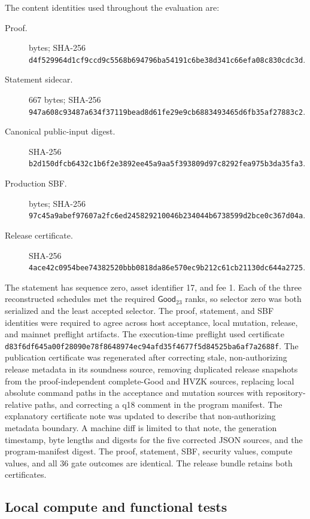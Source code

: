 The content identities used throughout the evaluation are:
\begin{description}
  \item[Proof.] \ProfileProofBytes{} bytes; SHA-256
  \nolinkurl{d4f529964d1cf9ccd9c5568b694796ba54191c6be38d341c66efa08c830cdc3d}.
  \item[Statement sidecar.] 667 bytes; SHA-256
  \nolinkurl{947a608c93487a634f37119bead8d61fe29e9cb6883493465d6fb35af27883c2}.
  \item[Canonical public-input digest.] SHA-256
  \nolinkurl{b2d150dfcb6432c1b6f2e3892ee45a9aa5f393809d97c8292fea975b3da35fa3}.
  \item[Production SBF.] \ProfileSbfBytes{} bytes; SHA-256
  \nolinkurl{97c45a9abef97607a2fc6ed245829210046b234044b6738599d2bce0c367d04a}.
  \item[Release certificate.] SHA-256
  \nolinkurl{4ace42c0954bee74382520bbb0818da86e570ec9b212c61cb21130dc644a2725}.
\end{description}

The statement has sequence zero, asset identifier 17, and fee 1.  Each of the
three reconstructed schedules met the required $\mathsf{Good}_{23}$ ranks,
so selector zero was both serialized and the least accepted selector.  The
proof, statement, and SBF identities were required to agree across host
acceptance, local mutation, release, and mainnet preflight artifacts.
The execution-time preflight used certificate
\nolinkurl{d83f6df645a00f28090e78f8648974ec94afd35f4677f5d84525ba6af7a2688f}.
The publication certificate was regenerated after correcting stale,
non-authorizing release metadata in its soundness source, removing duplicated
release snapshots from the proof-independent complete-Good and HVZK sources,
replacing local absolute command paths in the acceptance and mutation sources
with repository-relative paths, and correcting a q18 comment in the program
manifest.  The explanatory certificate note was updated to describe that
non-authorizing metadata boundary.  A machine diff is limited to that note,
the generation timestamp, byte lengths and digests for the five corrected
JSON sources, and the program-manifest digest.  The proof, statement, SBF,
security values, compute values, and all 36 gate outcomes are identical.  The
release bundle retains both certificates.

\subsection{Local compute and functional tests}
\label{sec:evaluation-local}

